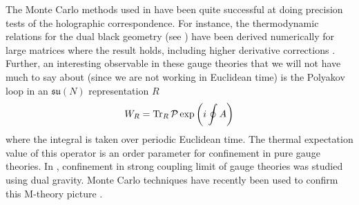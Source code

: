 The Monte Carlo methods used in \cite{Hanada:2012eg} have been quite successful at doing precision tests of the holographic correspondence. For instance, the thermodynamic relations for the dual black geometry (see \cite{Maldacena:2018vsr}) have been derived numerically for large matrices where the result holds, including higher derivative corrections \cite{Hanada:2008ez}. Further, an interesting observable in these gauge theories that we will not have much to say about (since we are not working in Euclidean time) is the Polyakov loop in an $\mathfrak{su}(N)$ representation $R$
\begin{equation}
    W_R = \Tr_R \mathcal{P} \exp \left( i \oint A  \right)
\end{equation}
where the integral is taken over periodic Euclidean time. The thermal expectation value of this operator is an order parameter for confinement in pure gauge theories. In \cite{Witten:1998zw}, confinement in strong coupling limit of gauge theories was studied using dual gravity. Monte Carlo techniques have recently been used to confirm this M-theory picture \cite{Bergner:2021goh}. 